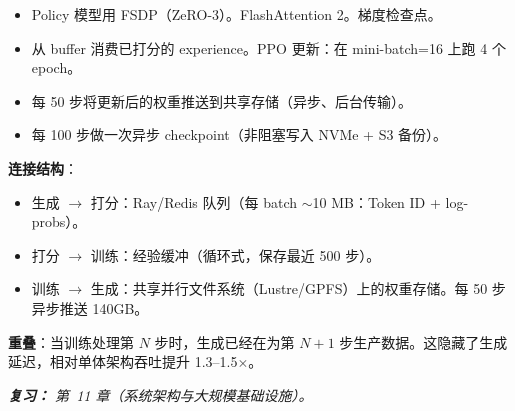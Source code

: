 \begin{questionbox}
\begin{itemize}
  \item Policy 模型用 FSDP（ZeRO-3）。FlashAttention 2。梯度检查点。
  \item 从 buffer 消费已打分的 experience。PPO 更新：在 mini-batch=16 上跑 4 个 epoch。
  \item 每 50 步将更新后的权重推送到共享存储（异步、后台传输）。
  \item 每 100 步做一次异步 checkpoint（非阻塞写入 NVMe + S3 备份）。
\end{itemize}

\textbf{连接结构}：

\begin{itemize}
  \item 生成 $\rightarrow$ 打分：Ray/Redis 队列（每 batch $\sim$10 MB：Token ID + log-probs）。
  \item 打分 $\rightarrow$ 训练：经验缓冲（循环式，保存最近 500 步）。
  \item 训练 $\rightarrow$ 生成：共享并行文件系统（Lustre/GPFS）上的权重存储。每 50 步异步推送 140GB。
\end{itemize}

\textbf{重叠}：当训练处理第 $N$ 步时，生成已经在为第 $N+1$ 步生产数据。这隐藏了生成延迟，相对单体架构吞吐提升 1.3--1.5$\times$。

\emph{\textbf{复习：} 第~11 章（系统架构与大规模基础设施）。}
\end{questionbox}

